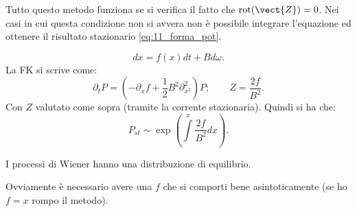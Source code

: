 \noindent
Tutto questo metodo funziona se si verifica il fatto che $\text{rot}(\vect{Z}) = 0$. Nei casi in cui questa condizione non si avvera non è possibile integrare l'equazione ed ottenere il risultato stazionario \ref{eq:11_forma_pot}.
\begin{exmp}
    \[
	dx = f(x) dt + Bd\omega
    .\] 
    La FK si scrive come:
    \[
        \partial_{t}P = \left(- \partial_{x}f + \frac{1}{2} B^2\partial^2_{x^2}\right)P; \qquad
	Z = \frac{2f}{B^2}
    .\] 
    Con $Z$  valutato come sopra (tramite la corrente stazionaria). Quindi si ha che:
    \[
	P_{st}\sim \exp\left(\int\limits^{x} \frac{2f}{B^2}dx \right) 
    .\] 
    \begin{greenbox}{}
        I processi di Wiener hanno una distribuzione di equilibrio.
    \end{greenbox}
    \noindent
    Ovviamente è necessario avere una $f$ che si comporti bene asintoticamente (se ho $f=x$ rompo il metodo).
\end{exmp}
\noindent

